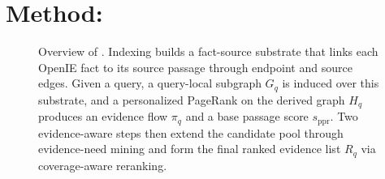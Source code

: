 %
%
%

\section{Method: \methodname{}}
\label{sec:method}

\begin{figure}[t]
\centering
{}
\caption{Overview of \methodname{}. Indexing builds a fact-source
substrate that links each OpenIE fact to its source passage through
endpoint and source edges. Given a query, a query-local subgraph
$G_q$ is induced over this substrate, and a personalized PageRank on
the derived graph $H_q$ produces an evidence flow $\pi_q$ and a base
passage score $s_{\mathrm{ppr}}$. Two evidence-aware steps then
extend the candidate pool through evidence-need mining and
form the final ranked evidence list $R_q$ via coverage-aware
reranking.}
\label{fig:overview}
\end{figure}


